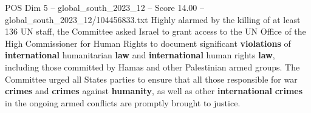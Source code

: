 \begin{textsample}{POS Dim 5 – global\_south\_2023\_12 – Score 14.00 – global\_south\_2023\_12/104456833.txt}
Highly alarmed by the killing of at least 136 UN staff, the Committee asked Israel to grant access to the UN Office of the High Commissioner for Human Rights to document significant \textbf{violations} of \textbf{international} humanitarian \textbf{law} and \textbf{international} human rights \textbf{law}, including those committed by Hamas and other Palestinian armed groups.
The Committee urged all States parties to ensure that all those responsible for war \textbf{crimes} and \textbf{crimes} against \textbf{humanity}, as well as other \textbf{international} \textbf{crimes} in the ongoing armed conflicts are promptly brought to justice.

\end{textsample}

